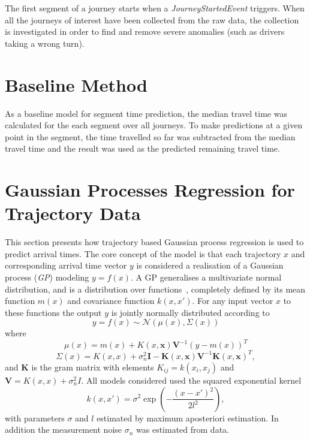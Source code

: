 The first segment of a journey starts when a \textit{JourneyStartedEvent} triggers. When all the journeys of interest have been collected from the raw data, the collection is investigated in order to find and remove severe anomalies (such as drivers taking a wrong turn). 

\section{Baseline Method}
As a baseline model for segment time prediction, the median travel time was calculated for the each segment over all journeys. To make predictions at a given point in the segment, the time travelled so far was subtracted from the median travel time and the result was used as the predicted remaining travel time.

\section{Gaussian Processes Regression for Trajectory Data}
This section presents how trajectory based Gaussian process regression
is used to predict arrival times. The core concept of the model is that each
trajectory $x$ and corresponding arrival time vector $y$ is
considered a realisation of a Gaussian process (\textit{GP}) modeling $y =
f(x)$. A GP generalises a multivariate
normal distribution, and is a distribution over
functions~\cite{Rasmussen-Williams-2006}, completely defined by its
mean function $m(x)$ and covariance function $k(x, x')$. For any input
vector $x$ to these functions the output $y$ is jointly normally distributed according to
\begin{equation}
  \label{eq:gp}
  y = f(x) \sim \mathcal{N}(\mu(x), \Sigma(x))
\end{equation}
where
\begin{equation}
  \label{eq:gp-mean-function}
  \mu(x) = m(x) + K(x, \textbf{x})\textbf{V}^{-1}{(y-m(x))}^{T}
\end{equation}
\begin{equation}
  \label{eq:gp-covariance-function}
  \Sigma(x) = K(x, x) + \sigma^{2}_n\textbf{I} - \textbf{K}(x, \textbf{x})\textbf{V}^{-1}{\textbf{K}(x, \textbf{x})}^{T},
\end{equation}
and $\textbf{K}$ is the gram matrix with elements $K_{ij} = k(x_i, x_j)$ and $\textbf{V}
= K(x, x) + \sigma_n^2I$. All models considered used the squared
exponential kernel
\begin{equation}
  k(x, x') = \sigma^2\exp(-\frac{(x-x')^{2}}{2l^2}),
\end{equation}
with parameters $\sigma$ and $l$ estimated by maximum aposteriori
estimation. In addition the measurement noise $\sigma_n$ was estimated
from data.

